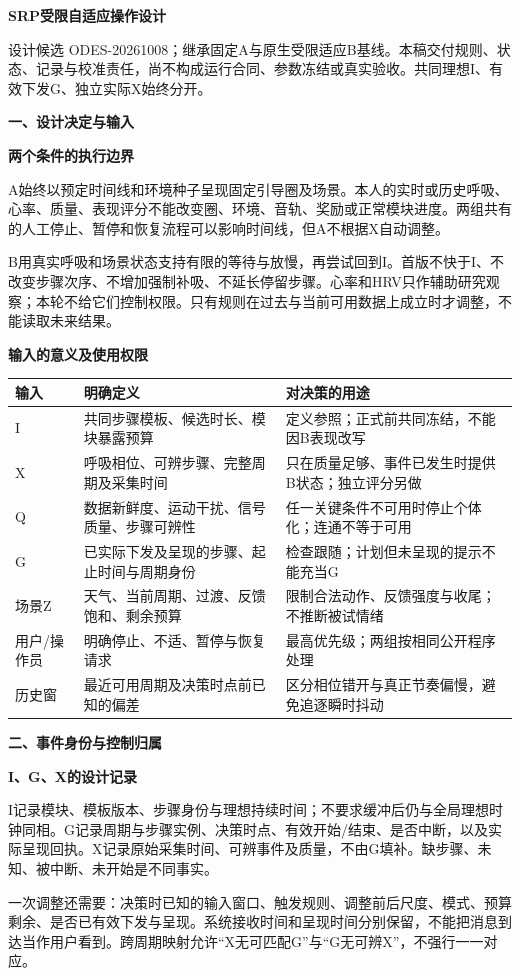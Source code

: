 \documentclass[11pt,a4paper]{article}
\newcommand{\reviewtitle}[1]{\begin{center}{\titlelatin\titlecjk\bfseries\fontsize{21}{28}\selectfont #1}\end{center}}
\newcommand{\reviewsection}[1]{\par\Needspace{6\baselineskip}\begin{center}{\titlelatin\titlecjk\bfseries\fontsize{14}{20}\selectfont #1}\end{center}}
\newcommand{\reviewsubsection}[1]{\par\Needspace{4\baselineskip}\begin{center}{\titlelatin\titlecjk\bfseries\fontsize{12}{18}\selectfont #1}\end{center}}
\begin{document}
\reviewtitle{SRP受限自适应操作设计}
设计候选 ODES-20261008；继承固定A与原生受限适应B基线。本稿交付规则、状态、记录与校准责任，尚不构成运行合同、参数冻结或真实验收。共同理想I、有效下发G、独立实际X始终分开。

\reviewsection{一、设计决定与输入}
\reviewsubsection{1.1 两个条件的执行边界}
A始终以预定时间线和环境种子呈现固定引导圈及场景。本人的实时或历史呼吸、心率、质量、表现评分不能改变圈、环境、音轨、奖励或正常模块进度。两组共有的人工停止、暂停和恢复流程可以影响时间线，但A不根据X自动调整。

B用真实呼吸和场景状态支持有限的等待与放慢，再尝试回到I。首版不快于I、不改变步骤次序、不增加强制补吸、不延长停留步骤。心率和HRV只作辅助研究观察；本轮不给它们控制权限。只有规则在过去与当前可用数据上成立时才调整，不能读取未来结果。

\reviewsubsection{1.2 输入的意义及使用权限}
\begin{longtable}{L{24mm}L{69mm}L{61mm}}
输入 & 明确定义 & 对决策的用途\\\hline
I & 共同步骤模板、候选时长、模块暴露预算 & 定义参照；正式前共同冻结，不能因B表现改写\\
X & 呼吸相位、可辨步骤、完整周期及采集时间 & 只在质量足够、事件已发生时提供B状态；独立评分另做\\
Q & 数据新鲜度、运动干扰、信号质量、步骤可辨性 & 任一关键条件不可用时停止个体化；连通不等于可用\\
G & 已实际下发及呈现的步骤、起止时间与周期身份 & 检查跟随；计划但未呈现的提示不能充当G\\
场景Z & 天气、当前周期、过渡、反馈饱和、剩余预算 & 限制合法动作、反馈强度与收尾；不推断被试情绪\\
用户/操作员 & 明确停止、不适、暂停与恢复请求 & 最高优先级；两组按相同公开程序处理\\
历史窗 & 最近可用周期及决策时点前已知的偏差 & 区分相位错开与真正节奏偏慢，避免追逐瞬时抖动\\
\end{longtable}

\reviewsection{二、事件身份与控制归属}
\reviewsubsection{2.1 I、G、X的设计记录}
I记录模块、模板版本、步骤身份与理想持续时间；不要求缓冲后仍与全局理想时钟同相。G记录周期与步骤实例、决策时点、有效开始/结束、是否中断，以及实际呈现回执。X记录原始采集时间、可辨事件及质量，不由G填补。缺步骤、未知、被中断、未开始是不同事实。

一次调整还需要：决策时已知的输入窗口、触发规则、调整前后尺度、模式、预算剩余、是否已有效下发与呈现。系统接收时间和呈现时间分别保留，不能把消息到达当作用户看到。跨周期映射允许“X无可匹配G”与“G无可辨X”，不强行一一对应。
\end{document}
